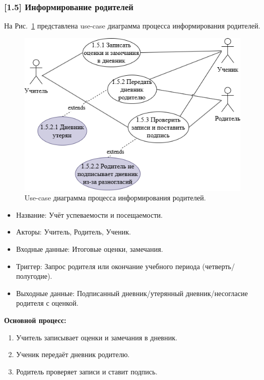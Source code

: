 \documentclass[a4paper, final]{article}
\begin{document}
\subsubsection{[1.5] Информирование родителей}
На Рис.~\ref{img:use_case25} представлена use-case диаграмма процесса информирования родителей.

\begin{figure}[H]
  \centering
  \includegraphics[width=\linewidth]{use_case25.png}
  \caption{Use-case диаграмма процесса информирования родителей.}
  \label{img:use_case25}
\end{figure}

\begin{itemize}
  \item Название: Учёт успеваемости и посещаемости.
  \item Акторы: Учитель, Родитель, Ученик.
  \item Входные данные: Итоговые оценки, замечания.
  \item Триггер: Запрос родителя или окончание учебного периода (четверть/полугодие).
  \item Выходные данные: Подписанный дневник/утерянный дневник/несогласие родителя с оценкой.
\end{itemize}

\textbf{Основной процесс:}
\begin{enumerate}
  \item[1.5.1] Учитель записывает оценки и замечания в дневник.
  \item[1.5.2] Ученик передаёт дневник родителю.
  \item[1.5.3] Родитель проверяет записи и ставит подпись.
\end{enumerate}
\end{document}
